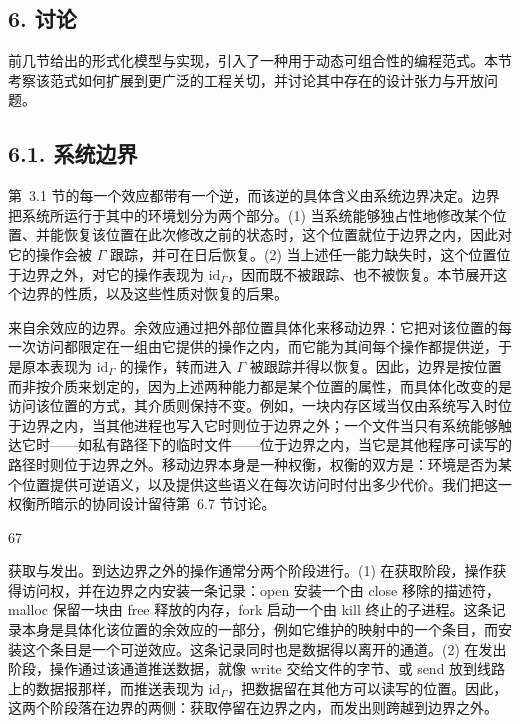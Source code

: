 \subsection{6. 讨论}\label{discussion}

前几节给出的形式化模型与实现，引入了一种用于动态可组合性的编程范式。本节考察该范式如何扩展到更广泛的工程关切，并讨论其中存在的设计张力与开放问题。

\subsection{6.1. 系统边界}\label{system-boundary}

第~3.1 节的每一个效应都带有一个逆，而该逆的具体含义由系统边界决定。边界把系统所运行于其中的环境划分为两个部分。(1) 当系统能够独占性地修改某个位置、并能恢复该位置在此次修改之前的状态时，这个位置就位于边界之内，因此对它的操作会被 $\Gamma$ 跟踪，并可在日后恢复。(2) 当上述任一能力缺失时，这个位置位于边界之外，对它的操作表现为 \(\mathrm { i d } _ { \Gamma }\)，因而既不被跟踪、也不被恢复。本节展开这个边界的性质，以及这些性质对恢复的后果。

来自余效应的边界。余效应通过把外部位置具体化来移动边界：它把对该位置的每一次访问都限定在一组由它提供的操作之内，而它能为其间每个操作都提供逆，于是原本表现为 \(\mathrm { i d } _ { \Gamma }\) 的操作，转而进入 $\Gamma$ 被跟踪并得以恢复。因此，边界是按位置而非按介质来划定的，因为上述两种能力都是某个位置的属性，而具体化改变的是访问该位置的方式，其介质则保持不变。例如，一块内存区域当仅由系统写入时位于边界之内，当其他进程也写入它时则位于边界之外；一个文件当只有系统能够触达它时——如私有路径下的临时文件——位于边界之内，当它是其他程序可读写的路径时则位于边界之外。移动边界本身是一种权衡，权衡的双方是：环境是否为某个位置提供可逆语义，以及提供这些语义在每次访问时付出多少代价。我们把这一权衡所暗示的协同设计留待第~6.7 节讨论。

67

获取与发出。到达边界之外的操作通常分两个阶段进行。(1) 在获取阶段，操作获得访问权，并在边界之内安装一条记录：open 安装一个由 close 移除的描述符，malloc 保留一块由 free 释放的内存，fork 启动一个由 kill 终止的子进程。这条记录本身是具体化该位置的余效应的一部分，例如它维护的映射中的一个条目，而安装这个条目是一个可逆效应。这条记录同时也是数据得以离开的通道。(2) 在发出阶段，操作通过该通道推送数据，就像 write 交给文件的字节、或 send 放到线路上的数据报那样，而推送表现为 \(\mathrm { i d } _ { \Gamma }\)，把数据留在其他方可以读写的位置。因此，这两个阶段落在边界的两侧：获取停留在边界之内，而发出则跨越到边界之外。

